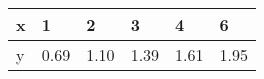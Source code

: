\documentclass{article}
\begin{document}
\begin{table}[h!]
\begin{tabular}{l|l|l|l|l|l}

\multicolumn{1}{p{30.865313pt}}{\raggedright x} & \multicolumn{1}{|p{30.865313pt}}{\raggedright 1} & \multicolumn{1}{|p{32.370937pt}}{\raggedright 2} & \multicolumn{1}{|p{30.1125pt}}{\raggedright 3} & \multicolumn{1}{|p{30.1125pt}}{\raggedright 4} & \multicolumn{1}{|p{30.1125pt}}{\raggedright 6}\\ 
\hline 
\multicolumn{1}{p{30.865313pt}}{\raggedright y} & \multicolumn{1}{|p{30.865313pt}}{\raggedright 0.69} & \multicolumn{1}{|p{32.370937pt}}{\raggedright 1.10} & \multicolumn{1}{|p{30.1125pt}}{\raggedright 1.39} & \multicolumn{1}{|p{30.1125pt}}{\raggedright 1.61} & \multicolumn{1}{|p{30.1125pt}}{\raggedright 1.95}\\ 


\end{tabular}
\end{table}
\end{document}
